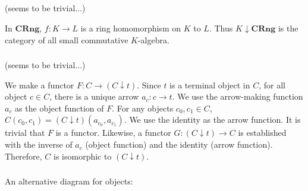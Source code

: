 \documentclass[luatex]{article}
\begin{document}
\subsubsection{}

\subsubsection{}

\subsection{}

\subsubsection{}

\showArt

(seems to be trivial...)

In $\mathbf{CRng}$, $f : K \rightarrow L$ is a ring homomorphism on $K$ to $L$. Thus $K \downarrow \mathbf{CRng}$ is the category of all small commutative $K$-algebra.

\subsubsection{}

\showArt

(seems to be trivial...)

We make a functor $F : C \rightarrow (C \downarrow t)$. Since $t$ is a terminal object in $C$, for all object $c \in C$, there is a unique arrow $a_c : c \rightarrow t$. We use the arrow-making function $a_c$ as the object function of $F$. For any objects $c_0, c_1 \in C$, $C(c_0, c_1) = (C \downarrow t)(a_{c_0}, a_{c_1})$. We use the identity as the arrow function. It is trivial that $F$ is a functor. Likewise, a functor $G : (C \downarrow t) \rightarrow C$ is established with the inverse of $a_c$ (object function) and the identity (arrow function). Therefore, $C$ is isomorphic to $(C \downarrow t)$. 

\subsubsection{}

\showArt

An alternative diagram for objects:

\begin{center}
\end{center}
\end{document}
